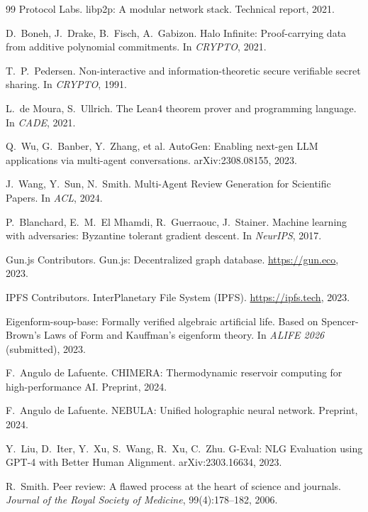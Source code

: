 \documentclass[11pt,a4paper]{article}
\theoremstyle{plain}
\theoremstyle{definition}
\theoremstyle{remark}
\begin{document}
\begin{thebibliography}{99}
Protocol Labs.
\newblock libp2p: A modular network stack.
\newblock Technical report, 2021.

D.~Boneh, J.~Drake, B.~Fisch, A.~Gabizon.
\newblock Halo Infinite: Proof-carrying data from additive polynomial
  commitments.
\newblock In \emph{CRYPTO}, 2021.

T.~P.~Pedersen.
\newblock Non-interactive and information-theoretic secure verifiable secret
  sharing.
\newblock In \emph{CRYPTO}, 1991.

L.~de Moura, S.~Ullrich.
\newblock The Lean4 theorem prover and programming language.
\newblock In \emph{CADE}, 2021.

Q.~Wu, G.~Banber, Y.~Zhang, et al.
\newblock AutoGen: Enabling next-gen LLM applications via multi-agent
  conversations.
\newblock arXiv:2308.08155, 2023.

J.~Wang, Y.~Sun, N.~Smith.
\newblock Multi-Agent Review Generation for Scientific Papers.
\newblock In \emph{ACL}, 2024.

P.~Blanchard, E.~M.~El Mhamdi, R.~Guerraouc, J.~Stainer.
\newblock Machine learning with adversaries: Byzantine tolerant gradient
  descent.
\newblock In \emph{NeurIPS}, 2017.

Gun.js Contributors.
\newblock Gun.js: Decentralized graph database.
\newblock \url{https://gun.eco}, 2023.

IPFS Contributors.
\newblock InterPlanetary File System (IPFS).
\newblock \url{https://ipfs.tech}, 2023.

Eigenform-soup-base: Formally verified algebraic artificial life.
\newblock Based on Spencer-Brown's Laws of Form and Kauffman's eigenform
  theory.
\newblock In \emph{ALIFE 2026} (submitted), 2023.

F.~Angulo de Lafuente.
\newblock CHIMERA: Thermodynamic reservoir computing for high-performance AI.
\newblock Preprint, 2024.

F.~Angulo de Lafuente.
\newblock NEBULA: Unified holographic neural network.
\newblock Preprint, 2024.

Y.~Liu, D.~Iter, Y.~Xu, S.~Wang, R.~Xu, C.~Zhu.
\newblock G-Eval: NLG Evaluation using GPT-4 with Better Human Alignment.
\newblock arXiv:2303.16634, 2023.

R.~Smith.
\newblock Peer review: A flawed process at the heart of science and journals.
\newblock \emph{Journal of the Royal Society of Medicine}, 99(4):178--182, 2006.


\end{thebibliography}
\end{document}
